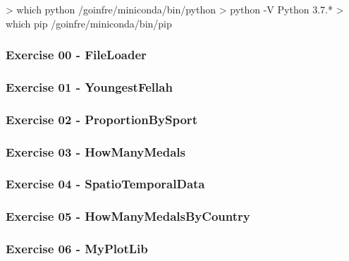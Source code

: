 \documentclass[]{article}
\newenvironment{Shaded}{\begin{snugshade}}{\end{snugshade}}
\newcommand{\NormalTok}[1]{\textcolor[rgb]{0.81,0.81,0.76}{#1}}
\begin{document}
\begin{Shaded}
\begin{Highlighting}[]
\NormalTok{> which python}
\NormalTok{/goinfre/miniconda/bin/python}
\NormalTok{> python -V}
\NormalTok{Python 3.7.*}
\NormalTok{> which pip}
\NormalTok{/goinfre/miniconda/bin/pip}
\end{Highlighting}
\end{Shaded}

\hypertarget{exercise-00---fileloader}{%
\subsubsection{Exercise 00 -
FileLoader}\label{exercise-00---fileloader}}

\hypertarget{exercise-01---youngestfellah}{%
\subsubsection{Exercise 01 -
YoungestFellah}\label{exercise-01---youngestfellah}}

\hypertarget{exercise-02---proportionbysport}{%
\subsubsection{Exercise 02 -
ProportionBySport}\label{exercise-02---proportionbysport}}

\hypertarget{exercise-03---howmanymedals}{%
\subsubsection{Exercise 03 -
HowManyMedals}\label{exercise-03---howmanymedals}}

\hypertarget{exercise-04---spatiotemporaldata}{%
\subsubsection{Exercise 04 -
SpatioTemporalData}\label{exercise-04---spatiotemporaldata}}

\hypertarget{exercise-05---howmanymedalsbycountry}{%
\subsubsection{Exercise 05 -
HowManyMedalsByCountry}\label{exercise-05---howmanymedalsbycountry}}

\hypertarget{exercise-06---myplotlib}{%
\subsubsection{Exercise 06 - MyPlotLib}\label{exercise-06---myplotlib}}
\end{document}
